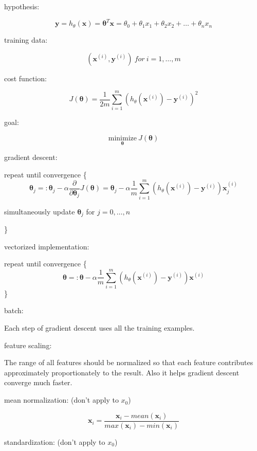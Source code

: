 \documentclass{article}
\begin{document}
\noindent hypothesis:

\[\textbf{y} = h_{\theta}(\textbf{x}) = \boldsymbol{\theta}^T \textbf{x} = \theta_0 + \theta_1 x_1 + \theta_2 x_2 + \dots + \theta_n x_n\]

\noindent training data:

\[(\textbf{x}^{(i)}, \textbf{y}^{(i)})\:for\:i = 1, \dots, m\]

\noindent cost function:

\[J(\boldsymbol{\theta}) = \frac{1}{2m} \sum_{i = 1}^m (h_{\theta}(\textbf{x}^{(i)}) - \textbf{y}^{(i)})^2\]

\noindent goal:

\[\underset{\boldsymbol{\theta}}{\text{minimize}} \: J(\boldsymbol{\theta})\]

\noindent gradient descent:

\noindent repeat until convergence \{
\[\boldsymbol{\theta}_j =: \boldsymbol{\theta}_j - \alpha \frac{\partial}{\partial \boldsymbol{\theta}_j} J(\boldsymbol{\theta}) = \boldsymbol{\theta}_j - \alpha \frac{1}{m} \sum_{i = 1}^m (h_{\theta}(\textbf{x}^{(i)}) - \textbf{y}^{(i)}) \textbf{x}^{(i)}_j\]
\centerline{simultaneously update \(\boldsymbol{\theta}_j\) for \(j = 0, \dots, n\)}
\}

\bigskip

\noindent vectorized implementation:

\noindent repeat until convergence \{
\[\boldsymbol{\theta} =: \boldsymbol{\theta} - \alpha \frac{1}{m} \sum_{i = 1}^m (h_{\theta}(\textbf{x}^{(i)}) - \textbf{y}^{(i)}) \textbf{x}^{(i)}\]
\}

\bigskip


\noindent batch:

\noindent Each step of gradient descent uses all the training examples.

\bigskip

\noindent feature scaling:

\noindent The range of all features should be normalized so that each feature contributes approximately proportionately to the result. Also it helps gradient descent converge much faster.

\bigskip

\noindent mean normalization: (don't apply to \(x_0\))

\[\textbf{x}_i = \frac{\textbf{x}_i - mean(\textbf{x}_i)}{max(\textbf{x}_i) - min(\textbf{x}_i)}\]

\bigskip

\noindent standardization: (don't apply to \(x_0\))
\end{document}
